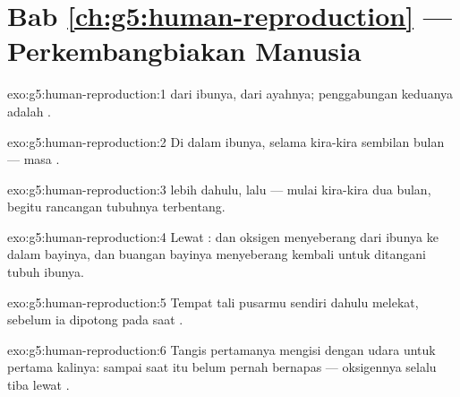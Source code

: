 \section*{Bab \ref{ch:g5:human-reproduction} --- Perkembangbiakan Manusia}

\begin{solution}{exo:g5:human-reproduction:1}
 dari ibunya,  dari ayahnya; penggabungan keduanya
adalah .
\end{solution}

\begin{solution}{exo:g5:human-reproduction:2}
Di dalam  ibunya, selama kira-kira sembilan bulan --- masa
.
\end{solution}

\begin{solution}{exo:g5:human-reproduction:3}
 lebih dahulu, lalu  --- mulai kira-kira dua bulan, begitu
rancangan tubuhnya terbentang.
\end{solution}

\begin{solution}{exo:g5:human-reproduction:4}
Lewat :  dan oksigen menyeberang dari  ibunya
ke dalam  bayinya, dan buangan bayinya menyeberang kembali untuk
ditangani tubuh ibunya.
\end{solution}

\begin{solution}{exo:g5:human-reproduction:5}
Tempat tali pusarmu sendiri dahulu melekat, sebelum ia dipotong pada
saat .
\end{solution}

\begin{solution}{exo:g5:human-reproduction:6}
Tangis pertamanya mengisi  dengan udara untuk pertama
kalinya: sampai saat itu  belum pernah bernapas ---
oksigennya selalu tiba lewat .
\end{solution}

